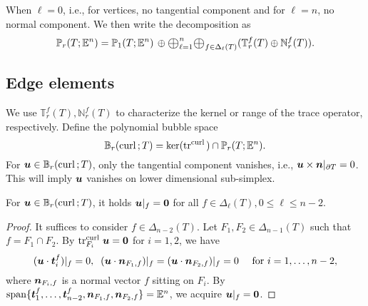 \documentclass[10pt]{amsart}
\newcommand{\Oplus}{\ensuremath{\vcenter{\hbox{\scalebox{1.5}{$\oplus$}}}}}
\newcommand{\prox}{\operatorname{Prox}}
\begin{document}
When $\ell = 0$, i.e., for vertices, no tangential component and for $\ell = n$, no normal component. We then write the decomposition as
\begin{align}\label{eq:Prvecdec}
\mathbb P_r(T; \mathbb E^n)=\mathbb P_1(T; \mathbb E^n) \,\oplus \Oplus_{\ell = 1}^{n}\Oplus_{f\in \Delta_{\ell}(T)} (\mathbb{T}^f_r(T)\oplus \mathbb{N}^f_r(T)).
\end{align}






\subsection{Edge elements}
We use $\mathbb T_{r}^f(T), \mathbb N_{r}^f(T)$ to characterize the kernel or range of the trace operator, respectively.
Define the polynomial bubble space
$$
\mathbb B_r({\rm curl\,}; T) = \ker(\operatorname{tr}^{{\rm curl\,}})\cap \mathbb P_r(T;\mathbb E^n).
$$
For $\boldsymbol u \in \mathbb B_r({\rm curl\,}; T)$, only the tangential component vanishes, i.e., $\boldsymbol u\times \boldsymbol n|_{\partial T} = 0$. This will imply $\boldsymbol u$ vanishes on lower dimensional sub-simplex. 

\begin{lemma}\label{lm:curlbubbleface}
For $\boldsymbol u\in \mathbb B_r({\rm curl\,}; T)$, it holds $\boldsymbol u|_f=\boldsymbol0$ for all $f\in\Delta_{\ell}(T), 0\leq \ell\leq n-2$.
\end{lemma}
\begin{proof}
It suffices to consider $f\in \Delta_{n-2}(T)$. Let $F_1, F_2\in\Delta_{n-1}(T)$ such that $f=F_1\cap F_2$. By $\operatorname{tr}_{F_i}^{{\rm curl\,}}\boldsymbol u=\boldsymbol0$ for $i=1,2$, we have
$$
(\boldsymbol u\cdot\boldsymbol t_i^f)|_f=0, \;\; (\boldsymbol u\cdot\boldsymbol n_{F_1, f})|_f=(\boldsymbol u\cdot\boldsymbol n_{F_2, f})|_f=0\quad \textrm{ for } i=1,\ldots, n-2,
$$
where $\boldsymbol n_{F_i, f}$ is a normal vector $f$ sitting on $F_i$. By $\operatorname*{span} \{\boldsymbol t_1^f, \ldots, \boldsymbol t_{n-2}^f, \boldsymbol n_{F_1, f}, \boldsymbol n_{F_2, f} \} = \mathbb E^n$, we acquire $\boldsymbol u|_f=\boldsymbol0$. 
\end{proof}
\end{document}

